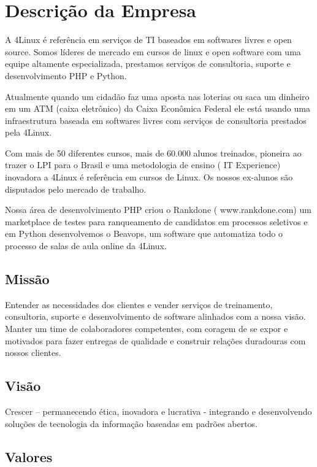 \chapter[Descrição da Empresa]{Descrição da Empresa}

A 4Linux é referência em serviços de TI baseados em softwares livres e open source. Somos líderes de mercado em cursos de linux e open software com uma equipe altamente especializada, prestamos serviços de consultoria, suporte e desenvolvimento PHP e Python. 

Atualmente quando um cidadão faz uma aposta nas loterias ou saca um dinheiro em um ATM (caixa eletrônico) da Caixa Econômica Federal ele está usando uma infraestrutura baseada em softwares livres com serviços de consultoria prestados pela 4Linux. 

Com mais de 50 diferentes cursos, mais de 60.000 alunos treinados, pioneira ao trazer o LPI para o Brasil e uma metodologia de ensino ( IT Experience) inovadora a 4Linux é referência em cursos de Linux. Os nossos ex-alunos são disputados pelo mercado de trabalho. 

Nossa área de desenvolvimento PHP criou o Rankdone ( www.rankdone.com) um marketplace de testes para ranqueamento de candidatos em processos seletivos e em Python desenvolvemos o Beavops, um software que automatiza todo o processo de salas de aula online da 4Linux.

\section{Missão}

Entender as necessidades dos clientes e vender serviços de treinamento, consultoria, suporte e desenvolvimento de software alinhados com a nossa visão. Manter um time de colaboradores competentes, com coragem de se expor e motivados para fazer entregas de qualidade e construir relações duradouras com nossos clientes.

\section{Visão}

Crescer – permanecendo ética, inovadora e lucrativa - integrando e desenvolvendo soluções de tecnologia da informação baseadas em padrões abertos.

\section{Valores}

